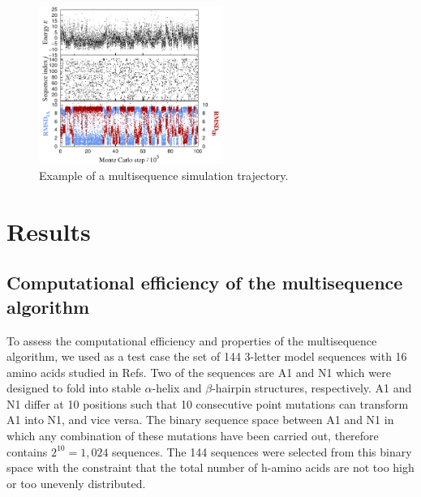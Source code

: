 \documentclass[%
 aip,
rsi,%
 amsmath,amssymb,
 reprint,%
]{revtex4-1}
\begin{document}
\begin{figure}
\includegraphics[width=6.0cm]{MCtraj}
\caption{Example of a multisequence simulation trajectory.}
\end{figure}

%
%
%
%

\section{Results}

\subsection{Computational efficiency of the multisequence algorithm}
\noindent
To assess the computational efficiency and properties of the multisequence algorithm, we used as a test case the set of 144 3-letter model sequences with 16 amino acids studied in Refs.\cite{Holzgrafe2014} Two of the sequences are A1 and N1 which were designed to fold into stable $\alpha$-helix and $\beta$-hairpin structures, respectively. A1 and N1 differ at 10 positions such that 10 consecutive point mutations can transform A1 into N1, and vice versa. The binary sequence space between A1 and N1 in which any combination of these mutations have been carried out, therefore contains $2^{10}=1,024$ sequences. The 144 sequences were selected from this binary space with the constraint that the total number of h-amino acids are not too high or too unevenly distributed.~\cite{Holzgrafe2014}
\end{document}
